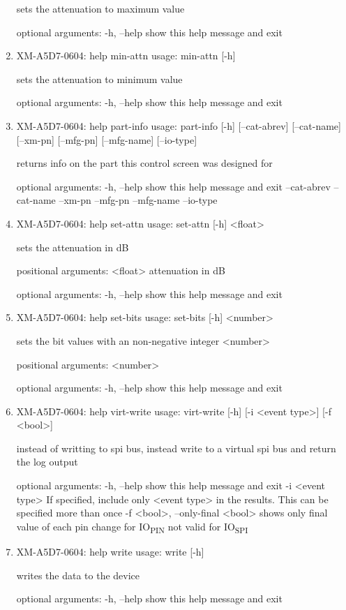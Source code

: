\documentclass[11pt]{article}
\begin{document}
\begin{enumerate}
sets the attenuation to maximum value

optional arguments:
  -h, --help  show this help message and exit

\item XM-A5D7-0604: help min-attn
\label{sec:org9f35472}
usage: min-attn [-h]

sets the attenuation to minimum value

optional arguments:
  -h, --help  show this help message and exit

\item XM-A5D7-0604: help part-info
\label{sec:org06d8e8c}
usage: part-info  [-h] [--cat-abrev] [--cat-name] [--xm-pn] [--mfg-pn] [--mfg-name]
        [--io-type]

returns info on the part this control screen was designed for

optional arguments:
  -h, --help   show this help message and exit
  --cat-abrev
  --cat-name
  --xm-pn
  --mfg-pn
  --mfg-name
  --io-type

\item XM-A5D7-0604: help set-attn
\label{sec:orgc438341}
usage: set-attn [-h] <float>

sets the attenuation in dB

positional arguments:
  <float>     attenuation in dB

optional arguments:
  -h, --help  show this help message and exit

\item XM-A5D7-0604: help set-bits
\label{sec:orgcb80fc6}
usage: set-bits [-h] <number>

sets the bit values with an non-negative integer <number>

positional arguments:
  <number>

optional arguments:
  -h, --help  show this help message and exit

\item XM-A5D7-0604: help virt-write
\label{sec:orgc37b9ec}
usage: virt-write [-h] [-i <event type>] [-f <bool>]

instead of writting to spi bus, instead write to a virtual spi bus and return
the log output

optional arguments:
  -h, --help            show this help message and exit
  -i <event type>       If specified, include only <event type> in the
                        results. This can be specified more than once
  -f <bool>, --only-final <bool>
                        shows only final value of each pin change for IO\textsubscript{PIN}
                        not valid for IO\textsubscript{SPI}

\item XM-A5D7-0604: help write
\label{sec:org4a56fcc}
usage: write [-h]

writes the data to the device

optional arguments:
  -h, --help  show this help message and exit
\end{enumerate}
\end{document}
